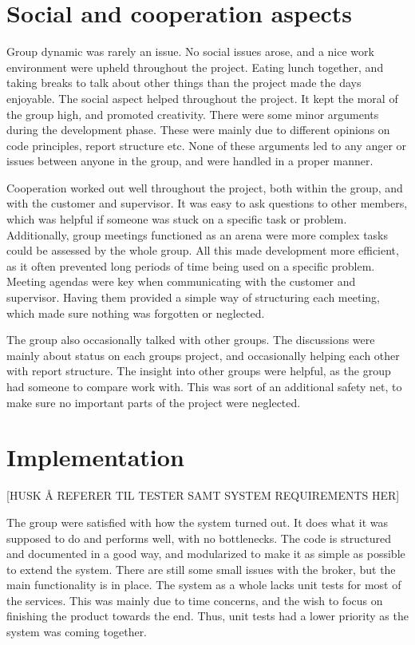 \section{Social and cooperation aspects}
\label{sec:Social_and_cooperation_aspects}

Group dynamic was rarely an issue. No social issues arose, and a nice work environment were upheld throughout the project. Eating lunch together, and taking breaks to talk about other things than the project made the days enjoyable. The social aspect helped throughout the project. It kept the moral of the group high, and promoted creativity. There were some minor arguments during the development phase. These were mainly due to different opinions on code principles, report structure etc. None of these arguments led to any anger or issues between anyone in the group, and were handled in a proper manner.

Cooperation worked out well throughout the project, both within the group, and with the customer and supervisor. It was easy to ask questions to other members, which was helpful if someone was stuck on a specific task or problem. Additionally, group meetings functioned as an arena were more complex tasks could be assessed by the whole group. All this made development more efficient, as it often prevented long periods of time being used on a specific problem. Meeting agendas were key when communicating with the customer and supervisor. Having them provided a simple way of structuring each meeting, which made sure nothing was forgotten or neglected.

The group also occasionally talked with other groups. The discussions were mainly about status on each groups project, and occasionally helping each other with report structure. The insight into other groups were helpful, as the group had someone to compare work with. This was sort of an additional safety net, to make sure no important parts of the project were neglected.

\section{Implementation}
\label{sec:Implementation}

[HUSK Å REFERER TIL TESTER SAMT SYSTEM REQUIREMENTS HER]

The group were satisfied with how the system turned out. It does what it was supposed to do and performs well, with no bottlenecks. The code is structured and documented in a good way, and modularized to make it as simple as possible to extend the system. There are still some small issues with the broker, but the main functionality is in place. The system as a whole lacks unit tests for most of the services. This was mainly due to time concerns, and the wish to focus on finishing the product towards the end. Thus, unit tests had a lower priority as the system was coming together.

